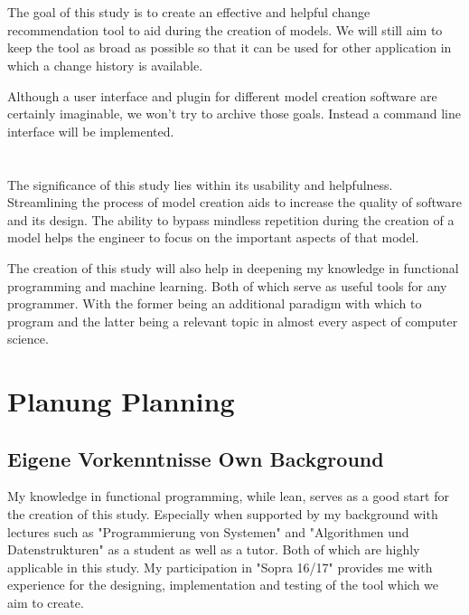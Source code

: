 \documentclass[10pt,a4paper,oneside]{scrartcl}
\begin{document}
	

	
	\section{}
	The goal of this study is to create an effective and helpful change recommendation tool to aid during the creation of models. We will still aim to keep the tool as broad as possible so that it can be used for other application in which a change history is available.
	
	Although a user interface and plugin for different model creation software are certainly imaginable, we won't try to archive those goals. Instead a command line interface will be implemented.
	
	
	\section{}
	The significance of this study lies within its usability and helpfulness. Streamlining the process of model creation aids to increase the quality of software and its design. The ability to bypass mindless repetition during the creation of a model helps the engineer to focus on the important aspects of that model. 
	
	The creation of this study will also help in deepening my knowledge in functional programming and machine learning. Both of which serve as useful tools for any programmer. With the former being an additional paradigm with which to program and the latter being a relevant topic in almost every aspect of computer science.
	
	
	\section{
		{Planung}
		{Planning}}
	\label{sec:planning}
	
	\subsection{
		{Eigene Vorkenntnisse}
		{Own Background}}
	\label{sub:background}
	My knowledge in functional programming, while lean, serves as a good start for the creation of this study. Especially when supported by my background with lectures such as "Programmierung von Systemen" and "Algorithmen und Datenstrukturen" as a student as well as a tutor. Both of which are highly applicable in this study. My participation in "Sopra 16/17" provides me with experience for the designing, implementation and testing of the tool which we aim to create. 
	
\end{document}

